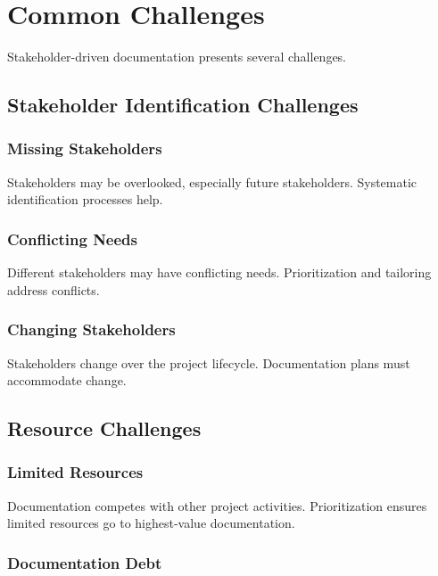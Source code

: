 \documentclass[11pt]{article}
\begin{document}
\section{Common Challenges}

Stakeholder-driven documentation presents several challenges.

\subsection{Stakeholder Identification Challenges}

\subsubsection{Missing Stakeholders}

Stakeholders may be overlooked, especially future stakeholders. Systematic identification processes help.

\subsubsection{Conflicting Needs}

Different stakeholders may have conflicting needs. Prioritization and tailoring address conflicts.

\subsubsection{Changing Stakeholders}

Stakeholders change over the project lifecycle. Documentation plans must accommodate change.

\subsection{Resource Challenges}

\subsubsection{Limited Resources}

Documentation competes with other project activities. Prioritization ensures limited resources go to highest-value documentation.

\subsubsection{Documentation Debt}
\end{document}
